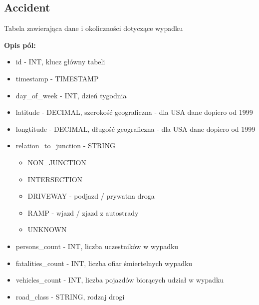 \subsection{Accident}\label{accident}

Tabela zawierająca dane i okoliczności dotyczące wypadku

\textbf{Opis pól:}

\begin{itemize}
\item
  id - INT, klucz główny tabeli\\
\item
  timestamp - TIMESTAMP\\
\item
  day\_of\_week - INT, dzień tygodnia\\
\item
  latitude - DECIMAL, szerokość geograficzna - dla USA dane dopiero od
  1999\\
\item
  longtitude - DECIMAL, długość geograficzna - dla USA dane dopiero od
  1999\\
\item
  relation\_to\_junction - STRING

  \begin{itemize}
  \itemsep1pt\parskip0pt
  \item
    NON\_JUNCTION\\
  \item
    INTERSECTION\\
  \item
    DRIVEWAY - podjazd / prywatna droga\\
  \item
    RAMP - wjazd / zjazd z autostrady\\
  \item
    UNKNOWN\\
  \end{itemize}
\item
  persons\_count - INT, liczba uczestników w wypadku\\
\item
  fatalities\_count - INT, liczba ofiar śmiertelnych wypadku\\
\item
  vehicles\_count - INT, liczba pojazdów biorących udział w wypadku\\
\item
  road\_class - STRING, rodzaj drogi


\end{itemize}
